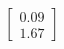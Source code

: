 \documentclass[preview]{standalone}
\begin{document}
\begin{align*}
\begin{bmatrix} 0.09 \\ 1.67 \end{bmatrix}
\end{align*}
\end{document}
